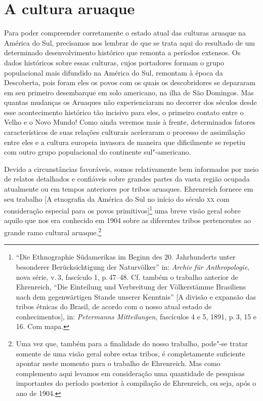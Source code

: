 
\chapter*{A cultura aruaque\smallskip{}}

Para poder compreender corretamente o estado atual das culturas aruaque
na América do Sul, precisamos nos lembrar de que se trata aqui do
resultado de um determinado desenvolvimento histórico que remonta a
períodos extensos. Os dados históricos sobre essas culturas, cujos
portadores formam o grupo populacional mais difundido na América do Sul,
remontam à época da Descoberta, pois foram eles os povos com os quais os
descobridores se depararam em seu primeiro desembarque em solo americano,
na ilha de São Domingos. Mas quantas mudanças os Aruaques não experienciaram no
decorrer dos séculos desde esse acontecimento histórico tão incisivo
para eles, o primeiro contato entre o Velho e o Novo Mundo! Como ainda veremos mais à frente,
determinados fatores característicos de suas relações culturais
aceleraram o processo de assimilação entre eles e a cultura europeia
invasora de maneira que dificilmente se repetiu com outro grupo
populacional do continente sul"-americano.

Devido a circunstâncias favoráveis, somos relativamente bem informados
por meio de relatos detalhados e confiáveis sobre grandes partes da
vasta região ocupada atualmente ou em tempos anteriores por tribos
aruaques. Ehrenreich fornece em seu trabalho {[}A etnografia da América do Sul no
início do século \textsc{xx} com consideração especial para os povos
primitivos{]}\footnote{``Die Ethnographie
Südamerikas im Beginn des 20. Jahrhunderts unter besonderer
Berücksichtigung der Naturvölker'' in: \textit{Archiv für Anthropologie}, nova série,
  v.\,3, fascículo 1, p.\,47--48. Cf. também o trabalho anterior de
  Ehrenreich, ``Die Einteilung und Verbreitung der Völkerstämme
  Brasiliens nach dem gegenwärtigen Stande unserer Kenntnis'' {[}A
  divisão e expansão das tribos étnicas do Brasil, de acordo com o nosso
  atual estado de conhecimentos{]}, in: \textit{Petermanns Mitteilungen},
  fascículos 4 e 5, 1891, p.\,3, 15 e 16. Com mapa.} uma breve visão
geral sobre aquilo que nos era conhecido em 1904 sobre as diferentes
tribos pertencentes ao grande ramo cultural aruaque.\footnote{Uma vez que, também
para a finalidade do nosso trabalho, pode"-se tratar somente de uma
visão geral sobre estas tribos, é completamente suficiente apontar neste
momento para o trabalho de Ehrenreich. Mas como complemento aqui
levamos em consideração uma quantidade de pesquisas importantes do
período posterior à compilação de Ehrenreich, ou seja, após o ano de
1904.}

